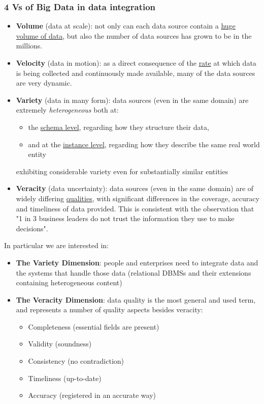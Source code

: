 \documentclass[10pt,a4paper]{article}
\begin{document}
\subsubsection{4 Vs of Big Data in data integration}
\begin{itemize}
	\item \textbf{Volume} (data at scale): not only can each data source contain a \uline{huge volume of data}, but also the number of data sources has grown to be in the millions.
	\item \textbf{Velocity} (data in motion): as a direct consequence of the \uline{rate} at which data is being collected and continuously made available, many of the data sources are very dynamic.
	\item \textbf{Variety} (data in many form): data sources (even in the same domain) are extremely \textit{heterogeneous} both at:
	\begin{itemize}
		\item the \uline{schema level}, regarding how they structure their data, 
		\item and at the \uline{instance level}, regarding how they describe the same real world entity
\end{itemize}
exhibiting considerable variety even for substantially similar entities
	\item \textbf{Veracity} (data uncertainty): data sources (even in the same domain) are of widely differing \uline{qualities}, with significant differences in the coverage, accuracy and timeliness of data provided. This is consistent with the observation that "1 in 3 business leaders do not trust the information they use to make decisions".
\end{itemize}
In particular we are interested in:
\begin{itemize}
	\item \textbf{The Variety Dimension}: people and enterprises need to integrate data and the systems that handle those data (relational DBMSs and their extensions containing heterogeneous content)
	\item \textbf{The Veracity Dimension}: data quality is the most general and used term, and represents a number of quality aspects besides veracity:
	\begin{itemize}
		\item Completeness (essential fields are present)
		\item Validity (soundness)
		\item Consistency (no contradiction)
		\item Timeliness (up-to-date)
		\item Accuracy (registered in an accurate way)
	\end{itemize}
\end{itemize}
\end{document}
